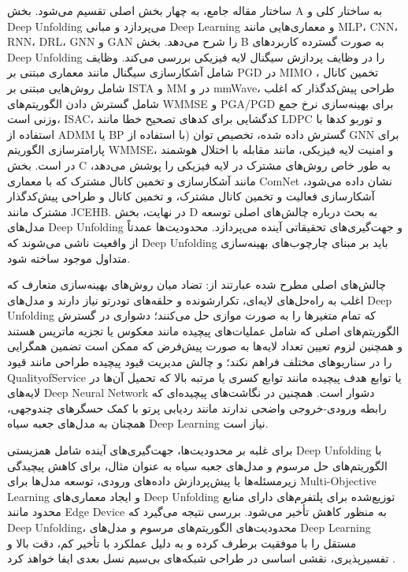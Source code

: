 ساختار  مقاله جامع، به چهار بخش اصلی تقسیم می‌شود. بخش A به ساختار کلی 
و 
\gls{Deep Unfolding}
 می‌پردازد و مبانی 
\gls{Deep Learning}
و معماری‌هایی مانند
\gls{MLP}، \gls{CNN}، \gls{RNN}، \gls{DRL}، \gls{GNN}
 و
\gls{GAN} 
	را شرح می‌دهد. بخش B به صورت گسترده کاربردهای 
\gls{Deep Unfolding}
	 را در وظایف پردازش سیگنال لایه فیزیکی بررسی می‌کند.  وظایف شامل آشکارسازی سیگنال مانند معماری 
	  مبتنی بر 
\gls{PGD}
	  در 
\gls{MIMO}  
	  ، تخمین کانال شامل روش‌هایی مبتنی بر 
\gls{ISTA}
 و 
\gls{MM}
  در 
   و 
\gls{mmWave}،
    طراحی پیش‌کدگذار که اغلب شامل گسترش دادن الگوریتم‌های 
\gls{WMMSE}
     و 
\gls{PGA}/\gls{PGD}
      برای بهینه‌سازی نرخ جمع وزنی است، 
\gls{ISAC}،
 کدگشایی برای کدهای تصحیح خطا مانند 
\gls{LDPC}
  و توربو کدها با استفاده از 
\gls{ADMM}
   یا 
\gls{BP}
    گسترش داده شده، تخصیص توان (با استفاده از 
\gls{GNN}
     برای پارامترسازی الگوریتم 
\gls{WMMSE}،
      و امنیت لایه فیزیکی، مانند مقابله با اختلال هوشمند در 
      است. بخش C به طور خاص روش‌های مشترک در لایه فیزیکی را پوشش می‌دهد، مانند آشکارسازی و تخمین کانال مشترک که با معماری ComNet نشان داده می‌شود، آشکارسازی فعالیت و تخمین کانال مشترک، و تخمین کانال و طراحی پیش‌کدگذار مشترک مانند 
\gls{JCEHB}.
در نهایت، بخش D به بحث درباره چالش‌های اصلی توسعه مدل‌های 
\gls{Deep Unfolding}
 و جهت‌گیری‌های تحقیقاتی آینده می‌پردازد.  محدودیت‌ها عمدتاً از  واقعیت ناشی می‌شوند که 
\gls{Deep Unfolding}
  باید بر مبنای چارچوب‌های بهینه‌سازی متداول موجود ساخته شود.
  
چالش‌های اصلی مطرح شده عبارتند از: تضاد میان روش‌های بهینه‌سازی متعارف که اغلب به راه‌حل‌های لایه‌ای، تکرارشونده و حلقه‌های تودرتو نیاز دارند و مدل‌های 
\gls{Deep Unfolding}
 که تمام متغیرها را به صورت موازی حل می‌کنند؛ دشواری در گسترش الگوریتم‌های اصلی که شامل عملیات‌های پیچیده مانند معکوس یا تجزیه ماتریس هستند و همچنین لزوم تعیین تعداد لایه‌ها به صورت پیش‌فرض که ممکن است تضمین همگرایی را در سناریوهای مختلف فراهم نکند؛ و چالش مدیریت قیود پیچیده طراحی مانند قیود 
\gls{QualityofService}
 یا توابع هدف پیچیده مانند توابع کسری یا مرتبه بالا که تحمیل آن‌ها در لایه‌های 
\gls{Deep Neural Network}
  دشوار است. همچنین در نگاشت‌های پیچیده‌ای که رابطه ورودی-خروجی واضحی ندارند مانند ردیابی پرتو با کمک حسگرهای چندوجهی، همچنان به مدل‌های جعبه سیاه 
\gls{Deep Learning}
 نیاز است.
 
برای غلبه بر  محدودیت‌ها، جهت‌گیری‌های آینده شامل همزیستی 
\gls{Deep Unfolding}
 با الگوریتم‌های حل مرسوم و مدل‌های جعبه سیاه به عنوان مثال، برای کاهش پیچیدگی زیرمسئله‌ها یا پیش‌پردازش داده‌های ورودی، توسعه مدل‌ها برای
\gls{Multi-Objective Learning}
 و ایجاد معماری‌های 
\gls{Deep Unfolding}
  توزیع‌شده برای پلتفرم‌های دارای منابع محدود مانند 
\gls{Edge Device}
   به منظور کاهش تأخیر می‌شود.  بررسی نتیجه می‌گیرد که 
\gls{Deep Unfolding}،
    محدودیت‌های الگوریتم‌های مرسوم و مدل‌های 
\gls{Deep Learning}
 مستقل را با موفقیت برطرف کرده و به دلیل عملکرد با تأخیر کم، دقت بالا و تفسیرپذیری، نقشی اساسی در طراحی شبکه‌های بی‌سیم نسل بعدی ایفا خواهد کرد
\cite{ComprehensiveReview}.

